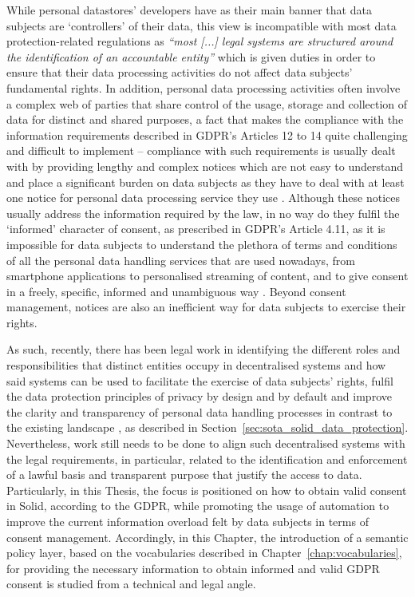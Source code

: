 While personal datastores' developers have as their main banner that data subjects are `controllers' of their data, this view is incompatible with most data protection-related regulations as \textit{``most [...] legal systems are structured around the identification of an accountable entity''} \citep{chomczyk_penedo_selfsovereign_2021} which is given duties in order to ensure that their data processing activities do not affect data subjects' fundamental rights.
In addition, personal data processing activities often involve a complex web of parties that share control of the usage, storage and collection of data for distinct and shared purposes, a fact that makes the compliance with the information requirements described in GDPR's Articles 12 to 14 quite challenging and difficult to implement \citep{lovato_more_2023} -- compliance with such requirements is usually dealt with by providing lengthy and complex notices which are not easy to understand and place a significant burden on data subjects as they have to deal with at least one notice for personal data processing service they use \citep{terpstra_improving_2019,linden_privacy_2020}.
Although these notices usually address the information required by the law, in no way do they fulfil the `informed' character of consent, as prescribed in GDPR's Article 4.11, as it is impossible for data subjects to understand the plethora of terms and conditions of all the personal data handling services that are used nowadays, from smartphone applications to personalised streaming of content, and to give consent in a freely, specific, informed and unambiguous way \citep{mohan_analyzing_2019}.
Beyond consent management, notices are also an inefficient way for data subjects to exercise their rights.

As such, recently, there has been legal work in identifying the different roles and responsibilities that distinct entities occupy in decentralised systems and how said systems can be used to facilitate the exercise of data subjects' rights, fulfil the data protection principles of privacy by design and by default and improve the clarity and transparency of personal data handling processes in contrast to the existing landscape \citep{janssen_personal_2020}, as described in Section~\ref{sec:sota_solid_data_protection}.
Nevertheless, work still needs to be done to align such decentralised systems with the legal requirements, in particular, related to the identification and enforcement of a lawful basis and transparent purpose that justify the access to data.  
Particularly, in this Thesis, the focus is positioned on how to obtain valid consent in Solid, according to the GDPR, while promoting the usage of automation to improve the current information overload felt by data subjects in terms of consent management.
Accordingly, in this Chapter, the introduction of a semantic policy layer, based on the vocabularies described in Chapter~\ref{chap:vocabularies}, for providing the necessary information to obtain informed and valid GDPR consent is studied from a technical and legal angle.

